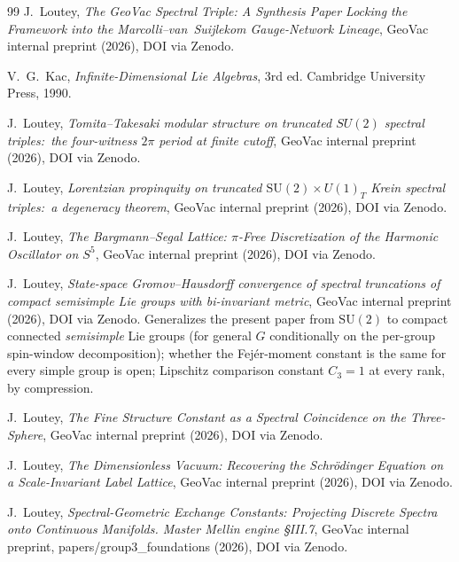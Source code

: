 \documentclass[11pt,a4paper]{article}
\theoremstyle{plain}
\theoremstyle{definition}
\newcommand{\SU}{\mathrm{SU}}
\begin{document}
\begin{thebibliography}{99}
J.~Loutey,
\newblock \emph{The GeoVac Spectral Triple: A Synthesis Paper Locking
the Framework into the Marcolli--van~Suijlekom Gauge-Network Lineage},
\newblock GeoVac internal preprint (2026), DOI via Zenodo.

V.~G.~Kac,
\newblock \emph{Infinite-Dimensional Lie Algebras}, 3rd ed.
\newblock Cambridge University Press, 1990.

J.~Loutey,
\newblock \emph{Tomita--Takesaki modular structure on truncated
$SU(2)$ spectral triples:\ the four-witness $2\pi$ period at finite
cutoff},
\newblock GeoVac internal preprint (2026), DOI via Zenodo.

J.~Loutey,
\newblock \emph{Lorentzian propinquity on truncated
$\SU(2) \times U(1)_T$ Krein spectral triples:\ a degeneracy theorem},
\newblock GeoVac internal preprint (2026), DOI via Zenodo.

J.~Loutey,
\newblock \emph{The Bargmann--Segal Lattice: $\pi$-Free Discretization
of the Harmonic Oscillator on $S^5$},
\newblock GeoVac internal preprint (2026), DOI via Zenodo.

J.~Loutey,
\newblock \emph{State-space Gromov--Hausdorff convergence of spectral
truncations of compact semisimple Lie groups with bi-invariant metric},
\newblock GeoVac internal preprint (2026), DOI via Zenodo.
\newblock Generalizes the present paper from $\SU(2)$ to compact
connected \emph{semisimple} Lie groups (for general $G$ conditionally on
the per-group spin-window decomposition); whether the Fej\'er-moment
constant is the same for every simple group is open; Lipschitz
comparison constant $C_3 = 1$ at every rank, by compression.

J.~Loutey,
\newblock \emph{The Fine Structure Constant as a Spectral Coincidence
on the Three-Sphere},
\newblock GeoVac internal preprint (2026), DOI via Zenodo.

J.~Loutey,
\newblock \emph{The Dimensionless Vacuum: Recovering the Schr\"odinger
Equation on a Scale-Invariant Label Lattice},
\newblock GeoVac internal preprint (2026), DOI via Zenodo.

J.~Loutey,
\newblock \emph{Spectral-Geometric Exchange Constants: Projecting
Discrete Spectra onto Continuous Manifolds. Master Mellin engine
\S III.7},
\newblock GeoVac internal preprint, papers/group3\_foundations (2026),
DOI via Zenodo.


\end{thebibliography}
\end{document}
